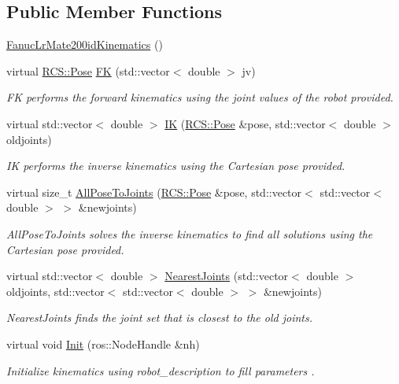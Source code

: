 \subsection*{Public Member Functions}
\begin{DoxyCompactItemize}
\item 
\hyperlink{classFanucLrMate200idKinematics_a4cfa739cb588db9cfaddcb4227662632}{Fanuc\-Lr\-Mate200id\-Kinematics} ()
\item 
virtual \hyperlink{namespaceRCS_aa07e45d8a50e30064283d2b38087f999}{R\-C\-S\-::\-Pose} \hyperlink{classFanucLrMate200idKinematics_a42b44b203b26d356dd9cc7769658138e}{F\-K} (std\-::vector$<$ double $>$ jv)
\begin{DoxyCompactList}\small\item\em F\-K performs the forward kinematics using the joint values of the robot provided. \end{DoxyCompactList}\item 
virtual std\-::vector$<$ double $>$ \hyperlink{classFanucLrMate200idKinematics_a54a3ef5b0e8db49e1ee3362ba2642df6}{I\-K} (\hyperlink{namespaceRCS_aa07e45d8a50e30064283d2b38087f999}{R\-C\-S\-::\-Pose} \&pose, std\-::vector$<$ double $>$ oldjoints)
\begin{DoxyCompactList}\small\item\em I\-K performs the inverse kinematics using the Cartesian pose provided. \end{DoxyCompactList}\item 
virtual size\-\_\-t \hyperlink{classFanucLrMate200idKinematics_a9273cba3818f4ce905f45643d8056eea}{All\-Pose\-To\-Joints} (\hyperlink{namespaceRCS_aa07e45d8a50e30064283d2b38087f999}{R\-C\-S\-::\-Pose} \&pose, std\-::vector$<$ std\-::vector$<$ double $>$ $>$ \&newjoints)
\begin{DoxyCompactList}\small\item\em All\-Pose\-To\-Joints solves the inverse kinematics to find all solutions using the Cartesian pose provided. \end{DoxyCompactList}\item 
virtual std\-::vector$<$ double $>$ \hyperlink{classFanucLrMate200idKinematics_ad7ec485c3eb09775d09512b0e15d3f84}{Nearest\-Joints} (std\-::vector$<$ double $>$ oldjoints, std\-::vector$<$ std\-::vector$<$ double $>$ $>$ \&newjoints)
\begin{DoxyCompactList}\small\item\em Nearest\-Joints finds the joint set that is closest to the old joints. \end{DoxyCompactList}\item 
virtual void \hyperlink{classFanucLrMate200idKinematics_a40dceae1773781d021c86aea16e40da8}{Init} (ros\-::\-Node\-Handle \&nh)
\begin{DoxyCompactList}\small\item\em Initialize kinematics using robot\-\_\-description to fill parameters . \end{DoxyCompactList}\end{DoxyCompactItemize}
